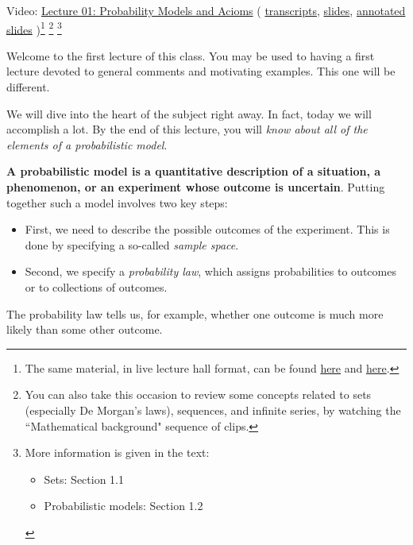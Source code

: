 \documentclass[pdftex, brazil, 12pt, twoside]{article}
\begin{document}
Video: \href{https://www.youtube.com/watch?v=qgwfz1FCPCc}{Lecture 01: Probability
  Models and Acioms} (%
\href{Unit-1/01\_lecture\_1\_probability\_models\_and\_axioms/l01\_overview\_transcripts.pdf}{transcripts},
\href{Unit-1/01\_lecture\_1\_probability\_models\_and\_axioms/l01\_overview\_slides.pdf}{slides},
\href{Unit-1/01\_lecture\_1\_probability\_models\_and\_axioms/l01\_overview\_annotated\_slides.pdf}{annotated slides}%
)\footnote{The same material, in live lecture hall format, can be found \href{http://ocw.mit.edu/courses/electrical-engineering-and-computer-science/6-041-probabilistic-systems-analysis-and-applied-probability-fall-2010/video-lectures/lecture-1-probability-models-and-axioms/}{here} and \href{http://www.youtube.com/watch?v=j9WZyLZCBzs}{here}.} \footnote{You can also take this occasion
  to review some concepts related to sets (especially De Morgan's laws), sequences,
  and infinite series, by watching the “Mathematical background" sequence of clips.} \footnote{More
  information is given in the text:
  \begin{itemize}[noitemsep]
  \item Sets: Section 1.1
  \item Probabilistic models: Section 1.2
  \end{itemize}
  }

Welcome to the first lecture of this class.
You may be used to having a first lecture devoted to
general comments and motivating examples.
This one will be different.

We will dive into the heart of the subject right away.
In fact, today we will accomplish a lot.
By the end of this lecture, you will \emph{know about all of the
elements of a probabilistic model}.

\textbf{A probabilistic model is a quantitative description of a
situation, a phenomenon, or an experiment whose outcome is uncertain}.
Putting together such a model involves two key steps:

\begin{itemize}
\item First, we need to describe the possible outcomes of the
  experiment. This is done by specifying a so-called \emph{sample space}.
\item Second, we specify a \emph{probability law}, which assigns
  probabilities to outcomes or to collections of outcomes.
\end{itemize}

The probability law tells us, for example, whether one
outcome is much more likely than some other outcome.
\end{document}
